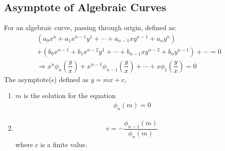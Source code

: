 \documentclass[../main.tex]{subfile}
\begin{document}
    \subsection{Asymptote of Algebraic Curves}
    For an algebraic curve, passing through origin, defined as:
    \begin{align}
        & (a_0x^n + a_1 x^{n-1} y^1 + \cdots + a_{n-1} x y^{n-1} + a_n y^n )\nonumber\\
        & + ( b_0 x^{n-1} + b_1 x^{n-2} y^1 + \cdots + b_{n-1}xy^{n-2} + b_n y^{n-1}) + \cdots = 0 \\
        & \Rightarrow x^n \phi_n \left( \dfrac{y}{x} \right) + x^{n-1} \phi_{n-1} \left( \dfrac{y}{x} \right) + \cdots + x \phi_1 \left( \dfrac{y}{x} \right) = 0\nonumber
    \end{align}
    The asymptote(s) defined as $y=mx+c$,
    \begin{enumerate}
    \item $m$ is the solution for the equation 
    \begin{align}
        \phi_n(m)=0
    \end{align}
    \item \begin{align}
        c=-\dfrac{\phi_{n-1}(m)}{\phi_n (m)}
    \end{align}
    where $c$ is a finite value.
    \end{enumerate}
\end{document}
